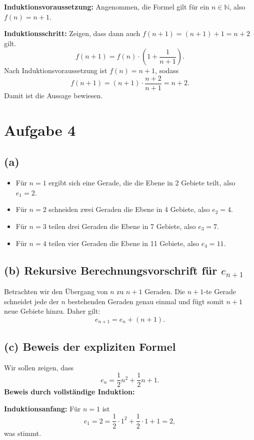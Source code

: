 \documentclass[a4paper]{scrartcl}
\begin{document}
\textbf{Induktionsvoraussetzung:} Angenommen, die Formel gilt für ein \( n \in \mathbb{N} \), also \( f(n) = n + 1 \).

\textbf{Induktionsschritt:} Zeigen, dass dann auch \( f(n+1) = (n+1) + 1 = n + 2 \) gilt.
\[
f(n+1) = f(n) \cdot \left(1 + \frac{1}{n+1}\right).
\]
Nach Induktionsvoraussetzung ist \( f(n) = n + 1 \), sodass
\[
f(n+1) = (n+1) \cdot \frac{n+2}{n+1} = n + 2.
\]
Damit ist die Aussage bewiesen.

\section*{Aufgabe 4}

\subsection*{(a)}
\begin{itemize}
    \item Für \( n = 1 \) ergibt sich eine Gerade, die die Ebene in 2 Gebiete teilt, also \( e_1 = 2 \).
    \item Für \( n = 2 \) schneiden zwei Geraden die Ebene in 4 Gebiete, also \( e_2 = 4 \).
    \item Für \( n = 3 \) teilen drei Geraden die Ebene in 7 Gebiete, also \( e_3 = 7 \).
    \item Für \( n = 4 \) teilen vier Geraden die Ebene in 11 Gebiete, also \( e_4 = 11 \).
\end{itemize}

\subsection*{(b) Rekursive Berechnungsvorschrift für \( e_{n+1} \)}
Betrachten wir den Übergang von \( n \) zu \( n+1 \) Geraden. Die \( n+1 \)-te Gerade schneidet jede der \( n \) bestehenden Geraden genau einmal und fügt somit \( n+1 \) neue Gebiete hinzu. Daher gilt:
\[
e_{n+1} = e_n + (n + 1).
\]

\subsection*{(c) Beweis der expliziten Formel}
Wir sollen zeigen, dass
\[
e_n = \frac{1}{2}n^2 + \frac{1}{2}n + 1.
\]
\textbf{Beweis durch vollständige Induktion:}

\textbf{Induktionsanfang:} Für \( n = 1 \) ist
\[
e_1 = 2 = \frac{1}{2} \cdot 1^2 + \frac{1}{2} \cdot 1 + 1 = 2,
\]
was stimmt.
\end{document}

